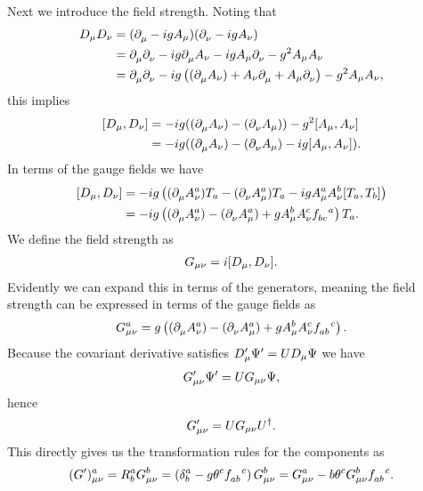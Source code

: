 Next we introduce the field strength. Noting that
\begin{align*}
	D_{\mu}D_{\nu} &= (\partial^{}_{\mu} - igA_{\mu})(\partial^{}_{\nu} - igA_{\nu}) \\
                   &= \partial^{}_{\mu}\partial^{}_{\nu} - ig\partial^{}_{\mu}A_{\nu} - igA_{\mu}\partial^{}_{\nu} - g^{2}A_{\mu}A_{\nu} \\
                   &= \partial^{}_{\mu}\partial^{}_{\nu} - ig\left((\partial^{}_{\mu}A_{\nu}) + A_{\nu}\partial^{}_{\mu} + A_{\mu}\partial^{}_{\nu}\right) - g^{2}A_{\mu}A_{\nu},
\end{align*}
this implies
\begin{align*}
	\comm{D_{\mu}}{D_{\nu}} &= -ig((\del{}{\mu}A_{\nu}) - (\del{}{\nu}A_{\mu})) - g^{2}\comm{A_{\mu}}{A_{\nu}} \\
                            &= -ig((\del{}{\mu}A_{\nu}) - (\del{}{\nu}A_{\mu}) - ig\comm{A_{\mu}}{A_{\nu}}).
\end{align*}
In terms of the gauge fields we have
\begin{align*}
	\comm{D_{\mu}}{D_{\nu}} &= -ig\left((\del{}{\mu}A_{\nu}^{a})T_{a} - (\del{}{\nu}A_{\mu}^{a})T_{a} - igA_{\mu}^{a}A_{\nu}^{b}\comm{T_{a}}{T_{b}}\right) \\
	                        &= -ig\left((\del{}{\mu}A_{\nu}^{a}) - (\del{}{\nu}A_{\mu}^{a}) + gA_{\mu}^{b}A_{\nu}^{c}\srconst{bc}{a}\right)T_{a}.
\end{align*}
We define the field strength as
\begin{align*}
	G_{\mu\nu} = i\comm{D_{\mu}}{D_{\nu}}.
\end{align*}
Evidently we can expand this in terms of the generators, meaning the field strength can be expressed in terms of the gauge fields as
\begin{align*}
	G_{\mu\nu}^{a} = g\left((\del{}{\mu}A_{\nu}^{a}) - (\del{}{\nu}A_{\mu}^{a}) + gA_{\mu}^{b}A_{\nu}^{c}\srconst{ab}{c}\right).
\end{align*}
Because the covariant derivative satisfies $D_{\mu}^{\prime}\Psi^{\prime} = UD_{\mu}\Psi$ we have
\begin{align*}
	G_{\mu\nu}^{\prime}\Psi^{\prime} = UG_{\mu\nu}\Psi,
\end{align*}
hence
\begin{align*}
	G_{\mu\nu}^{\prime} = UG_{\mu\nu}U^{\dagger}.
\end{align*}
This directly gives us the transformation rules for the components as
\begin{align*}
	(G\p)_{\mu\nu}^{a} = R_{b}^{a}G_{\mu\nu}^{b} = \left(\kdelta{a}{b} - g\theta^{c}\srconst{ab}{c}\right)G_{\mu\nu}^{b} = G_{\mu\nu}^{a} - b\theta^{c}G_{\mu\nu}^{b}\srconst{ab}{c}.
\end{align*}

